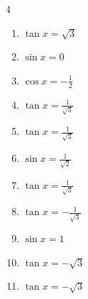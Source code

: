 \begin{multicols}{4}
\begin{enumerate}

  \item $\displaystyle \tan{x}  = \sqrt{3}$


  \item $\displaystyle \sin{x}  = 0$


  \item $\displaystyle \cos{x}  = -\frac{1}{2}$


  \item $\displaystyle \tan{x}  = \frac{1}{\sqrt{3}}$


  \item $\displaystyle \tan{x}  = \frac{1}{\sqrt{3}}$


\columnbreak %

  \item $\displaystyle \sin{x}  = \frac{1}{\sqrt{2}}$


  \item $\displaystyle \tan{x}  = \frac{1}{\sqrt{3}}$


  \item $\displaystyle \tan{x}  = -\frac{1}{\sqrt{3}}$


  \item $\displaystyle \sin{x}  = 1$


  \item $\displaystyle \tan{x}  = -\sqrt{3}$


  \item $\displaystyle \tan{x}  = -\sqrt{3}$


\end{enumerate}
\end{multicols}
